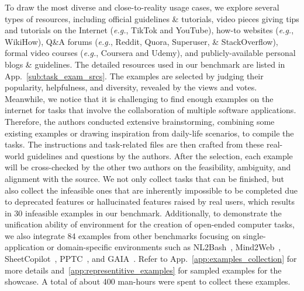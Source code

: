 To draw the most diverse and close-to-reality usage cases, we explore several types of resources, including official guidelines \& tutorials, video pieces giving tips and tutorials on the Internet (\textit{e.g.}, TikTok and YouTube), how-to websites (\textit{e.g.}, WikiHow), Q\&A forums (\textit{e.g.},
Reddit, Quora, Superuser, \& StackOverflow), formal video courses (\textit{e.g.}, Coursera and Udemy), and publicly-available personal blogs \& guidelines.
The detailed resources used in our benchmark are listed in 
App.~\ref{sub:task_exam_srcs}.
The examples are selected by judging their popularity, helpfulness, and diversity, revealed by the views and votes.
Meanwhile, we notice that it is challenging to find enough examples on the internet for tasks that involve the collaboration of multiple software applications. 
Therefore, the authors conducted extensive brainstorming, combining some existing examples or drawing inspiration from daily-life scenarios, to compile the tasks.
The instructions and task-related files are then crafted from these real-world guidelines and questions by the authors.
After the selection, each example will be cross-checked by the other two authors on the feasibility, ambiguity, and alignment with the source.
We not only collect tasks that can be finished, but also collect the infeasible ones that are inherently impossible to be completed due to deprecated features or hallucinated features raised by real users, which results in 30 infeasible examples in our benchmark.
Additionally, to demonstrate the unification ability of \ours environment for the creation of open-ended computer tasks, we also integrate 84 examples from other benchmarks focusing on single-application or domain-specific environments such as NL2Bash~\citep{lin2018nl2bash}, Mind2Web~\citep{deng2023mind2web}, SheetCopilot~\citep{li2023sheetcopilot}, PPTC~\citep{guo2023pptc}, and GAIA~\citep{mialon2023gaia}.
Refer to App.~\ref{app:examples_collection} for more details and~\ref{app:representitive_examples} for sampled examples for the showcase.
A total of about 400 man-hours were spent to collect these examples.

